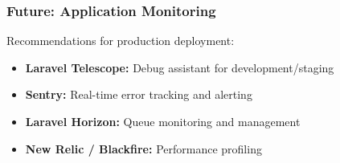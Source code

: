 \subsubsection{Future: Application Monitoring}

Recommendations for production deployment:

\begin{itemize}
    \item \textbf{Laravel Telescope:} Debug assistant for development/staging
    \item \textbf{Sentry:} Real-time error tracking and alerting
    \item \textbf{Laravel Horizon:} Queue monitoring and management
    \item \textbf{New Relic / Blackfire:} Performance profiling
\end{itemize}
